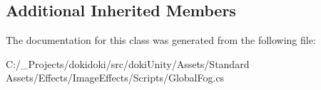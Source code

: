 \subsection*{Additional Inherited Members}


The documentation for this class was generated from the following file\+:\begin{DoxyCompactItemize}
\item 
C\+:/\+\_\+\+Projects/dokidoki/src/doki\+Unity/\+Assets/\+Standard Assets/\+Effects/\+Image\+Effects/\+Scripts/Global\+Fog.\+cs\end{DoxyCompactItemize}
